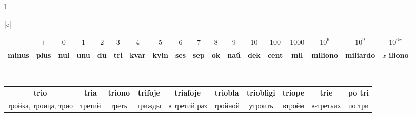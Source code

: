 \documentclass{article}
\def\b#1{\textbf{#1}}
\begin{document}
\begin{center}
\begin{tabular}{l}
\begin{tabular}{|c|}
\hline
\begin{tabular}{c|c|c|c|c|c|c|c|c|c|c|c|c|c|c|c|c|c}
\vspace*{-0.3em}\hspace{-0.3em}$-$ & $+$ & 0 & 1 & 2 & 3 & 4 & 5 & 6 & 7 & 8 & 9 & 10 & 100 & 1000 & $10^6$ & $10^9$ & $10^{6x}$\hspace{-0.3em} \\
\hspace{-0.3em}\b{minus} & \b{plus} & \b{nul} & \b{unu} & \b{du} & \b{tri} & \b{kvar} & \b{kvin} & \b{ses} & \b{sep} & \b{ok} & \b{naŭ} & \b{dek} & \b{cent} & \b{mil} & \b{miliono} & \b{miliardo} & $x$-\b{iliono}\hspace{-0.3em} \\
\end{tabular}\\
\hline
\begin{tabular}{c|c|c|c|c|c|c|c|c|c}
\vspace*{-0.3em}\hspace{-0.3em}\b{trio} & \b{tria} & \b{triono} & \b{trifoje} & \b{triafoje} & \b{triobla} & \b{triobligi} & \b{triope} & \b{trie} & \b{po tri}\hspace{-0.7em} \\
\hspace{-0.5em}тройка, троица, трио & третий & треть & трижды & в третий раз & тройной & утроить & втроём  & в-третьих & по три\hspace{-0.7em} \\
\end{tabular}\\
\hline
\end{tabular}
\vspace{0.5em}\\

\\
\end{tabular}
\end{center}
\end{document}
